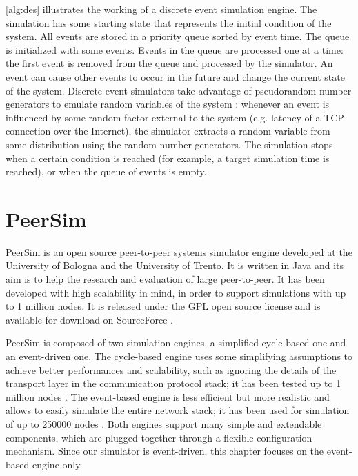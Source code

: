 \cref{alg:des} illustrates the working of a discrete event simulation engine.
The simulation has some starting state that represents the initial condition of the system.
All events are stored in a priority queue sorted by event time.
The queue is initialized with some events.
Events in the queue are processed one at a time:
the first event is removed from the queue and processed by the simulator.
An event can cause other events to occur in the future and change the current state of the system.
Discrete event simulators take advantage of pseudorandom number generators to emulate random variables of the system \cite{wikipedia_des}:
whenever an event is influenced by some random factor external to the system (e.g. latency of a TCP connection over the Internet), the simulator extracts a random variable from some distribution using the random number generators.
The simulation stops when a certain condition is reached (for example, a target simulation time is reached), or when the queue of events is empty.


\section{PeerSim}
PeerSim \cite{peersim_2009} is an open source peer-to-peer systems simulator engine developed at the University of Bologna and the University of Trento.
It is written in Java and its aim is to help the research and evaluation of large peer-to-peer.
It has been developed with high scalability in mind, in order to support simulations with up to \num{1} million nodes.
It is released under the GPL open source license and is available for download on SourceForce \cite{peersim_site}.

\medskip
PeerSim is composed of two simulation engines, a simplified cycle-based one and an event-driven one.
The cycle-based engine uses some simplifying assumptions to achieve better performances and scalability, such as ignoring the details of the transport layer in the communication protocol stack;
it has been tested up to \num{1} million nodes \cite{peersim_intro_2018}.
The event-based engine is less efficient but more realistic and allows to easily simulate the entire network stack;
it has been used for simulation of up to \num{250000} nodes \cite{peersim_intro_2018}.
Both engines support many simple and extendable components, which are plugged together through a flexible configuration mechanism.
Since our simulator is event-driven, this chapter focuses on the event-based engine only.

